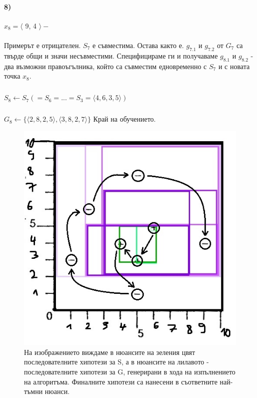 \documentclass[12pt]{article}
\begin{document}
	\paragraph{8)} $x_{8} = \langle $ 9, 4 $\rangle  -$
	\paragraph{}
	Примерът е отрицателен. $S_{7}$ е съвместима. Остава както е. $g_{7.1}$ и $g_{7.2}$ от $G_{7}$ са твърде общи и значи несъвместими. Специфицираме ги и получаваме $g_{8.1}$ и $g_{8.2}$ - два възможни правоъгълника, който са съвместим едновременно с $S_{7}$ и с новата точка $x_{8}$.
	\subparagraph{}
	$S_{8} \leftarrow S_{7} (= S_{6} = ... = S_{3} = \langle 4, 6, 3, 5 \rangle)$
	\subparagraph{}
	$G_{8} \leftarrow \{ \langle 2, 8, 2, 5 \rangle,\langle 3, 8, 2, 7 \rangle \}$
	\newline\newline
	Край на обучението.
	\newpage
	
	\begin{figure}[H]
		\centering
		\includegraphics[width=130mm]{Untitled.jpg} 
		\caption{На изображението виждаме в нюансите на зеления цвят последователните хипотези за S, а в нюансите на лилавото - последователните хипотези за G, генерирани в хода на изпълнението на алгоритъма. Финалните хипотези са нанесени в съответните най-тъмни нюанси.}
	\end{figure}
	\newpage
	
\end{document}
